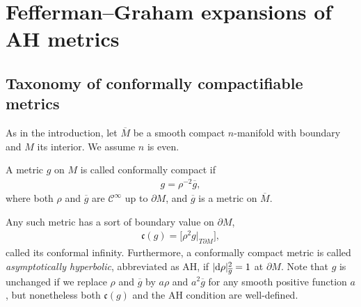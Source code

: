 \documentclass[pdftex]{sigma}
\numberwithin{equation}{section}
\newcommand{\del}{\partial}
\newcommand{\olg}{\overline{g}}
\newcommand{\calC}{\mathcal C}
\newcommand{\Mbar}{\overline{M}}
\begin{document}
\section{Fefferman--Graham expansions of AH metrics} \label {FGofAH}

\subsection{Taxonomy of conformally compactifiable metrics}
As in the introduction, let $\Mbar$ be a smooth compact $n$-manifold with boundary and $M$ its interior. We assume $n$ is even.

A metric $g$ on $M$ is called conformally compact if
\begin{gather*}%
g = \rho^{-2} \olg ,
\end{gather*}
where both $\rho$ and $\olg$ are $\calC^\infty$ up to $\del M$, and $\olg$ is a metric on $\Mbar$.

Any such metric has a sort of boundary value on $\del M$,
\begin{gather*}%
\mathfrak c(g) = \big[ \rho^2 g \big|_{T\del M} \big],
\end{gather*}
called its conformal infinity. Furthermore, a conformally compact metric is called \emph{asymptotically hyperbolic},
abbreviated as AH, if $|{\rm d}\rho|^2_{\olg} = 1$ at $\del M$. Note that $g$ is unchanged if we replace $\rho$ and $\olg$
by $a\rho$ and $a^2 \olg$ for any smooth positive function $a$, but nonetheless both $\mathfrak c(g)$ and the AH condition are well-defined.
\end{document}
